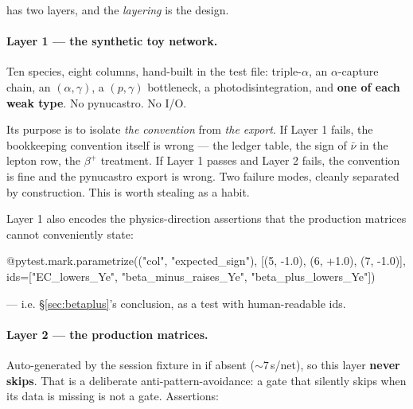  has two layers, and the \emph{layering} is
the design.

\paragraph{Layer 1 --- the synthetic toy network.} Ten species, eight columns,
hand-built in the test file: triple-$\alpha$, an $\alpha$-capture chain, an
$(\alpha,\gamma)$, a $(p,\gamma)$ bottleneck, a photodisintegration, and
\textbf{one of each weak type}. No pynucastro. No I/O.

Its purpose is to isolate \emph{the convention} from \emph{the export}. If Layer
1 fails, the bookkeeping convention itself is wrong --- the ledger table, the
sign of $\bar\nu$ in the lepton row, the $\beta^+$ treatment. If Layer 1 passes
and Layer 2 fails, the convention is fine and the pynucastro export is wrong.
Two failure modes, cleanly separated by construction. This is worth stealing as
a habit.

Layer 1 also encodes the physics-direction assertions that the production
matrices cannot conveniently state:

\begin{srclisting}
@pytest.mark.parametrize(("col", "expected_sign"),
    [(5, -1.0), (6, +1.0), (7, -1.0)],
    ids=["EC_lowers_Ye", "beta_minus_raises_Ye", "beta_plus_lowers_Ye"])
\end{srclisting}

--- i.e. \S\ref{sec:betaplus}'s conclusion, as a test with human-readable ids.

\paragraph{Layer 2 --- the production matrices.} Auto-generated by the session
fixture in  if absent (${\sim}7$\,s/net), so this layer
\textbf{never skips}. That is a deliberate anti-pattern-avoidance: a gate that
silently skips when its data is missing is not a gate. Assertions:

